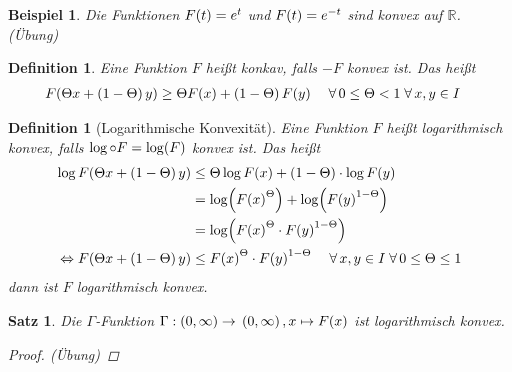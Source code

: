 \documentclass[11pt, twoside, a4paper]{article}
\theoremstyle{plain}
\newtheorem{definition}[blockelement]{Definition}
\newtheorem{satz}[blockelement]{Satz}
\newtheorem{beispiel}[blockelement]{Beispiel}
\numberwithin{equation}{subsection}
\newcommand{\pair}[1]{\left(#1\right)}
\newcommand{\of}[1]{\mathopen{}\mathclose{}\bgroup\left(#1\aftergroup\egroup\right)}
\newcommand{\equivalent}[0]{\Leftrightarrow{}}
\newcommand{\fromto}{\rightarrow{}}
\newcommand{\fa}{\;\forall\,}
\newcommand{\R}{\mathbb{R}}
\begin{document}
    \begin{beispiel}
        Die Funktionen $F\of{t} = e^{t}$ und $F\of{t} = e^{-t}$ sind konvex auf $\R$. (Übung)
    \end{beispiel}

    \begin{definition}
        Eine Funktion $F$ heißt konkav, falls $-F$ konvex ist. Das heißt
        \begin{align*}
            F\of{\Theta x + \pair{1-\Theta}y} &\geq \Theta F\of{x} + \pair{1-\Theta}F\of{y}\quad\fa 0\leq \Theta < 1\fa x,y\in I
        \end{align*}
    \end{definition}

    \begin{definition}[Logarithmische Konvexität]
        Eine Funktion $F$ heißt logarithmisch konvex, falls $\log \circ F = \log\of{F}$ konvex ist. Das heißt
        \begin{align*}
            \log F\of{\Theta x + \pair{1-\Theta} y} &\leq \Theta\log F\of{x} + \pair{1-\Theta}\cdot \log F\of{y}\\
            &= \log\of{F\of{x}^{\Theta}} + \log\of{F\of{y}^{1-\Theta}}\\
            &= \log\of{F\of{x}^{\Theta}\cdot F\of{y}^{1-\Theta}}\\
            \equivalent F\of{\Theta x + \pair{1-\Theta}y} &\leq F\of{x}^{\Theta} \cdot F\of{y}^{1-\Theta}\quad\fa x,y\in I\fa 0\leq \Theta \leq 1
        \end{align*}
        dann ist $F$ logarithmisch konvex.
    \end{definition}

    \begin{satz} %
        Die $\Gamma$-Funktion $\Gamma: \pair{0, \infty}\fromto \pair{0, \infty}, x\mapsto F\of{x}$ ist logarithmisch konvex.
        \begin{proof}
        (Übung)
        \end{proof}
    \end{satz}
\end{document}
